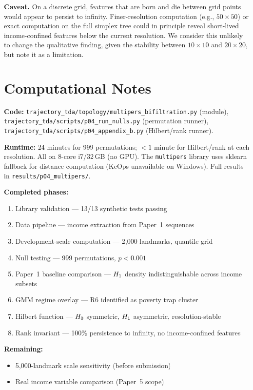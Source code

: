 \textbf{Caveat.} On a discrete grid, features that are born and die between
grid points would appear to persist to infinity. Finer-resolution computation
(e.g., $50 \times 50$) or exact computation on the full simplex tree could in
principle reveal short-lived income-confined features below the current
resolution. We consider this unlikely to change the qualitative finding, given
the stability between $10 \times 10$ and $20 \times 20$, but note it as a
limitation.

\section{Computational Notes}
\label{app:computational}

\textbf{Code:}
\texttt{trajectory\_tda/topology/multipers\_bifiltration.py} (module),
\texttt{trajectory\_tda/scripts/p04\_run\_nulls.py} (permutation runner),
\texttt{trajectory\_tda/scripts/p04\_appendix\_b.py} (Hilbert/rank runner).

\textbf{Runtime:} 24 minutes for 999 permutations; $< 1$ minute for
Hilbert/rank at each resolution. All on 8-core i7/32\,GB (no GPU). The
\texttt{multipers} library uses sklearn fallback for distance computation
(KeOps unavailable on Windows). Full results in
\texttt{results/p04\_multipers/}.

\textbf{Completed phases:}
\begin{enumerate}
  \item Library validation --- 13/13 synthetic tests passing
  \item Data pipeline --- income extraction from Paper~1 sequences
  \item Development-scale computation --- 2,000 landmarks, quantile grid
  \item Null testing --- 999 permutations, $p < 0.001$
  \item Paper~1 baseline comparison --- $H_{1}$ density indistinguishable
    across income subsets
  \item GMM regime overlay --- R6 identified as poverty trap cluster
  \item Hilbert function --- $H_{0}$ symmetric, $H_{1}$ asymmetric,
    resolution-stable
  \item Rank invariant --- 100\% persistence to infinity, no
    income-confined features
\end{enumerate}

\textbf{Remaining:}
\begin{itemize}
  \item 5,000-landmark scale sensitivity (before submission)
  \item Real income variable comparison (Paper~5 scope)
\end{itemize}

